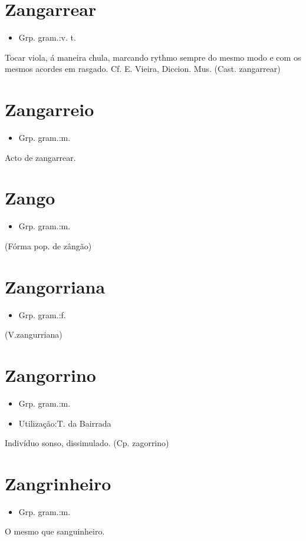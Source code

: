 \section{Zangarrear}
\begin{itemize}
\item {Grp. gram.:v. t.}
\end{itemize}
Tocar viola, á maneira chula, marcando rythmo sempre do mesmo modo e com os mesmos acordes em rasgado. Cf. E. Vieira, \textunderscore Diccion. Mus.\textunderscore 
(Cast. \textunderscore zangarrear\textunderscore )
\section{Zangarreio}
\begin{itemize}
\item {Grp. gram.:m.}
\end{itemize}
Acto de zangarrear.
\section{Zango}
\begin{itemize}
\item {Grp. gram.:m.}
\end{itemize}
(Fórma pop. de \textunderscore zângão\textunderscore )
\section{Zangorriana}
\begin{itemize}
\item {Grp. gram.:f.}
\end{itemize}
(V.zangurriana)
\section{Zangorrino}
\begin{itemize}
\item {Grp. gram.:m.}
\end{itemize}
\begin{itemize}
\item {Utilização:T. da Bairrada}
\end{itemize}
Indivíduo sonso, dissimulado.
(Cp. \textunderscore zagorrino\textunderscore )
\section{Zangrinheiro}
\begin{itemize}
\item {Grp. gram.:m.}
\end{itemize}
O mesmo que \textunderscore sanguinheiro\textunderscore .
